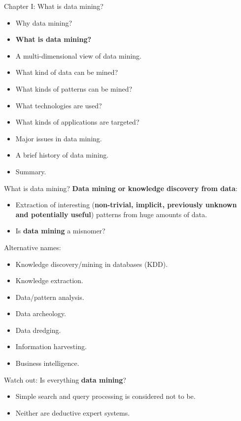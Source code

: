\documentclass[aspectratio=169,t]{beamer}
\begin{document}
  { 
    \begin{frame}{Chapter I: What is data mining?}
        \begin{itemize}
            \item Why data mining?
            \item \textbf{What is data mining?}
            \item A multi-dimensional view of data mining.
            \item What kind of data can be mined?
            \item What kinds of patterns can be mined?
            \item What technologies are used?
            \item What kinds of applications are targeted?
            \item Major issues in data mining.
            \item A brief history of data mining.
            \item Summary.
        \end{itemize}
    \end{frame}
  }

  { 
    \begin{frame}{What is data mining?}
    \textbf{Data mining or knowledge discovery from data}:
        \begin{itemize}
            \item Extraction of interesting (\textbf{non-trivial, implicit, previously unknown \\
                  and potentially useful}) patterns from huge amounts of data.
            \item Is \textbf{data mining} a misnomer?
        \end{itemize}
    Alternative names:
        \begin{itemize}
            \item Knowledge discovery/mining in databases (KDD).
            \item Knowledge extraction.
            \item Data/pattern analysis.
            \item Data archeology.
            \item Data dredging.
            \item Information harvesting.
            \item Business intelligence.
        \end{itemize}
    Watch out: Is everything \textbf{data mining}?
        \begin{itemize}
            \item Simple search and query processing is considered not to be.
            \item Neither are deductive expert systems.
        \end{itemize}
    \end{frame}
  }
\end{document}
